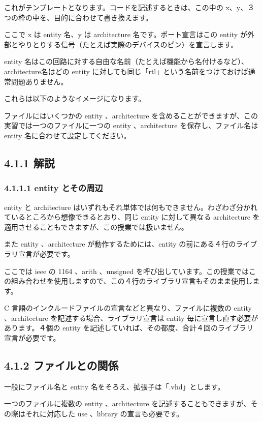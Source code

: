 \documentclass[letterpaper,10pt,dvipdfmx]{sphinxmanual}
\begin{document}
これがテンプレートとなります。コードを記述するときは、この中の x、y、３つの枠の中を、目的に合わせて書き換えます。

ここで x は entity 名、y は architecture 名です。ポート宣言はこの entity が外部とやりとりする信号（たとえば実際のデバイスのピン）を宣言します。

entity 名はこの回路に対する自由な名前（たとえば機能から名付けるなど）、architecture名はどの entity に対しても同じ「rtl」という名前をつけておけば通常問題ありません。

これらは以下のようなイメージになります。

ファイルにはいくつかの entity 、architecture を含めることができますが、この実習では一つのファイルに一つの entity 、architecture を保存し、ファイル名は entity 名に合わせて設定してください。


\subsection{4.1.1 解説}
\label{04_vhdl:id2}

\subsubsection{4.1.1.1 entity とその周辺}
\label{04_vhdl:entity}
entity と architecture はいずれもそれ単体では何もできません。わざわざ分かれているところから想像できるとおり、同じ entity に対して異なる architecture を適用させることもできますが、この授業では扱いません。

また entity 、architecture が動作するためには、entity の前にある４行のライブラリ宣言が必要です。

ここでは ieee の 1164 、arith 、unsigned を呼び出しています。この授業ではこの組み合わせを使用しますので、この４行のライブラリ宣言もそのまま使用します。

C 言語のインクルードファイルの宣言などと異なり、ファイルに複数の entity 、architecture を記述する場合、ライブラリ宣言は entity 毎に宣言し直す必要があります。４個の entity を記述していれば、その都度、合計４回のライブラリ宣言が必要です。


\subsection{4.1.2 ファイルとの関係}
\label{04_vhdl:id3}
一般にファイル名と entity 名をそろえ、拡張子は「.vhd」とします。

一つのファイルに複数の entity 、architecture を記述することもできますが、その際はそれに対応した use 、library の宣言も必要です。
\end{document}
